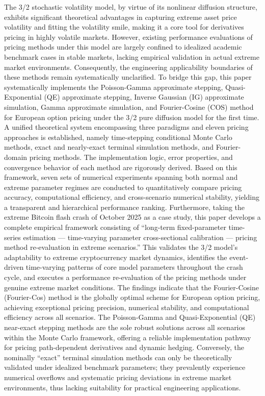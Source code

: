 \begin{eabstract}
	The 3/2 stochastic volatility model, by virtue of its nonlinear diffusion structure, exhibits significant theoretical advantages in capturing extreme asset price volatility and fitting the volatility smile, making it a core tool for derivatives pricing in highly volatile markets. However, existing performance evaluations of pricing methods under this model are largely confined to idealized academic benchmark cases in stable markets, lacking empirical validation in actual extreme market environments. Consequently, the engineering applicability boundaries of these methods remain systematically unclarified. 
    To bridge this gap, this paper systematically implements the Poisson-Gamma approximate stepping, Quasi-Exponential (QE) approximate stepping, Inverse Gaussian (IG) approximate simulation, Gamma approximate simulation, and Fourier-Cosine (COS) method for European option pricing under the 3/2 pure diffusion model for the first time. A unified theoretical system encompassing three paradigms and eleven pricing approaches is established, namely time-stepping conditional Monte Carlo methods, exact and nearly-exact terminal simulation methods, and Fourier-domain pricing methods. The implementation logic, error properties, and convergence behavior of each method are rigorously derived. Based on this framework, seven sets of numerical experiments spanning both normal and extreme parameter regimes are conducted to quantitatively compare pricing accuracy, computational efficiency, and cross-scenario numerical stability, yielding a transparent and hierarchical performance ranking.
    Furthermore, taking the extreme Bitcoin flash crash of October 2025 as a case study, this paper develops a complete empirical framework consisting of ``long-term fixed-parameter time-series estimation — time-varying parameter cross-sectional calibration — pricing method re-evaluation in extreme scenarios.'' This validates the 3/2 model's adaptability to extreme cryptocurrency market dynamics, identifies the event-driven time-varying patterns of core model parameters throughout the crash cycle, and executes a performance re-evaluation of the pricing methods under genuine extreme market conditions. 
    The findings indicate that the Fourier-Cosine (Fourier-Cos) method is the globally optimal scheme for European option pricing, achieving exceptional pricing precision, numerical stability, and computational efficiency across all scenarios. The Poisson-Gamma and Quasi-Exponential (QE) near-exact stepping methods are the sole robust solutions across all scenarios within the Monte Carlo framework, offering a reliable implementation pathway for pricing path-dependent derivatives and dynamic hedging. Conversely, the nominally ``exact'' terminal simulation methods can only be theoretically validated under idealized benchmark parameters; they prevalently experience numerical overflows and systematic pricing deviations in extreme market environments, thus lacking suitability for practical engineering applications. 

\end{eabstract}
